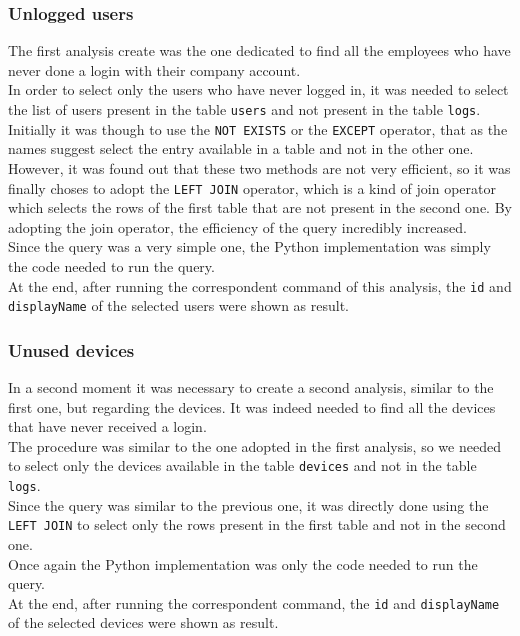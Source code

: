 \documentclass[12pt, a4paper, oneside]{article}
\begin{document}
\subsubsection{Unlogged users}
The first analysis create was the one dedicated to find all the employees who have never done a login with their company account.\\
In order to select only the users who have never logged in, it was needed to select the list of users present in the table \texttt{users} and not present in the table \texttt{logs}.\\
Initially it was though to use the \texttt{NOT EXISTS} or the \texttt{EXCEPT} operator, that as the names suggest select the entry available in a table and not in the other one.
However, it was found out that these two methods are not very efficient, so it was finally choses to adopt the \texttt{LEFT JOIN} operator, which is a kind of join operator which selects the rows of the 
first table that are not present in the second one. By adopting the join operator, the efficiency of the query incredibly increased.\\
Since the query was a very simple one, the Python implementation was simply the code needed to run the query.\\
At the end, after running the correspondent command of this analysis, the \texttt{id} and \texttt{displayName} of the selected users were shown as result.

\newpage
\subsubsection{Unused devices}
In a second moment it was necessary to create a second analysis, similar to the first one, but regarding the devices. It was indeed needed to find all the devices that have never received a login.\\
The procedure was similar to the one adopted in the first analysis, so we needed to select only the devices available in the table \texttt{devices} and not in the table \texttt{logs}.\\
Since the query was similar to the previous one, it was directly done using the \texttt{LEFT JOIN} to select only the rows present in the first table and not in the second one.\\
Once again the Python implementation was only the code needed to run the query.\\
At the end, after running the correspondent command, the \texttt{id} and \texttt{displayName} of the selected devices were shown as result.
\end{document}
